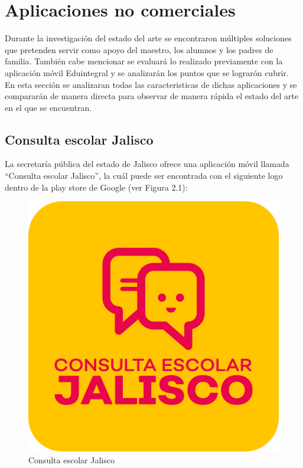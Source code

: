     \section{Aplicaciones no comerciales}
    
        Durante la investigación del estado del arte se encontraron múltiples soluciones que pretenden servir como apoyo del maestro, los alumnos y los padres de familia. También cabe mencionar se evaluará lo realizado previamente con la aplicación móvil Eduintegral \cite{eduintegral} y se analizarán los puntos que se lograrón cubrir. \\ En esta sección se analizaran todas las caracteristicas de dichas aplicaciones y se compararán de manera directa para observar de manera rápida el estado del arte en el que se encuentran.


        \subsection{Consulta escolar Jalisco}
        
            La secretaría pública del estado de Jalisco ofrece una aplicación móvil llamada ``Consulta escolar Jalisco'', la cuál puede ser encontrada con el siguiente logo dentro de la play store de Google (ver Figura 2.1):
            
            \begin{figure}[H]
                \centering
                \includegraphics[scale=0.3]{imagenes/consulta_escolar_jalisco.png}
                \caption{Consulta escolar Jalisco}
                \label{fig:consultaescolarjalisco}
            \end{figure}
            
